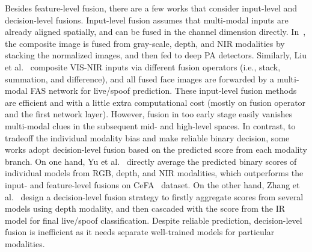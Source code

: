\documentclass[10pt,journal,compsoc]{IEEEtran}
\begin{document}
Besides feature-level fusion, there are a few works that consider input-level and decision-level fusions. Input-level fusion assumes that multi-modal inputs are already aligned spatially, and can be fused in the channel dimension directly. In~\cite{nikisins2019domain}, the composite image is fused from gray-scale, depth, and NIR modalities by stacking the normalized images, and then fed to deep PA detectors. Similarly, Liu et al.~\cite{liu2021data} composite VIS-NIR inputs via different fusion operators (i.e., stack, summation, and difference), and all fused face images are forwarded by a multi-modal FAS network for live/spoof prediction. These input-level fusion methods are efficient and with a little extra computational cost (mostly on fusion operator and the first network layer). However, fusion in too early stage easily vanishes multi-modal clues in the subsequent mid- and high-level spaces. In contrast, to tradeoff the individual modality bias and make reliable binary decision, some works adopt decision-level fusion based on the predicted score from each modality branch. On one hand, Yu et al.~\cite{yu2020multi} directly average the predicted binary scores of individual models from RGB, depth, and NIR modalities, which outperforms the input- and feature-level fusions on CeFA~\cite{li2020casia} dataset. On the other hand, Zhang et al.~\cite{zhang2019feathernets} design a decision-level fusion strategy to firstly aggregate scores from several models using depth modality, and then cascaded with the score from the IR model for final live/spoof classification. Despite reliable prediction, decision-level fusion is inefficient as it needs separate well-trained models for particular modalities. 

\vspace{0.4em}
\end{document}
